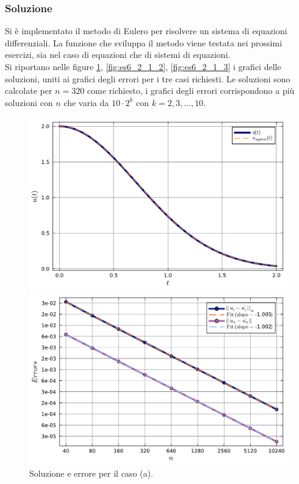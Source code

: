 \documentclass[letterpaper, 12pt]{article}
\begin{document}
\subsubsection{Soluzione}
Si è implementato il metodo di Eulero per risolvere un sistema di equazioni differenziali. La funzione che 
sviluppa il metodo viene testata nei prossimi esercizi, sia nel caso di equazioni che di sistemi di equazioni.\\
Si riportano nelle figure \ref{fig:es6_2_1_1}, \ref{fig:es6_2_1_2}, \ref{fig:es6_2_1_3} i grafici delle soluzioni, 
uniti ai grafici degli errori per i tre casi richiesti. Le soluzioni sono calcolate per $n = 320$ come richiesto,
i grafici degli errori corrispondono a più soluzioni con $n$ che varia da $10\cdot2^k$ con $k=2,3,\ldots,10$.
\begin{figure}[!ht]
    \centering
    \begin{minipage}[b]{0.47\textwidth}
        \includegraphics[width=\textwidth]{6221.pdf}
    \end{minipage}
    \hspace{0.5cm}
    \begin{minipage}[b]{0.47\textwidth}
        \includegraphics[width=\textwidth]{6222.pdf}
    \end{minipage}
    \caption{Soluzione e errore per il caso (a).}
    \label{fig:es6_2_1_1}
\end{figure}
\end{document}
